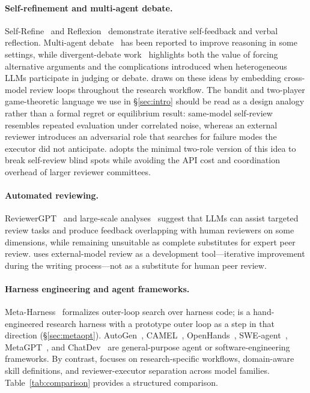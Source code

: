 \paragraph{Self-refinement and multi-agent debate.}
Self-Refine~\citep{madaan2023selfrefine} and Reflexion~\citep{shinn2023reflexion} demonstrate iterative self-feedback and verbal reflection. 
Multi-agent debate~\citep{du2024multiagentdebate} has been reported to improve reasoning in some settings, while divergent-debate work~\citep{liang2024divergent} highlights both the value of forcing alternative arguments and the complications introduced when heterogeneous LLMs participate in judging or debate.
\aris{} draws on these ideas by embedding cross-model review loops throughout the research workflow.
The bandit and two-player game-theoretic language we use in \S\ref{sec:intro} should be read as a design analogy rather than a formal regret or equilibrium result: same-model self-review resembles repeated evaluation under correlated noise, whereas an external reviewer introduces an adversarial role that searches for failure modes the executor did not anticipate.
\aris{} adopts the minimal two-role version of this idea to break self-review blind spots while avoiding the API cost and coordination overhead of larger reviewer committees.

\paragraph{Automated reviewing.}
ReviewerGPT~\citep{liu2023reviewergpt} and large-scale analyses~\citep{liang2024llmfeedback} suggest that LLMs can assist targeted review tasks and produce feedback overlapping with human reviewers on some dimensions, while remaining unsuitable as complete substitutes for expert peer review.
\aris{} uses external-model review as a development tool---iterative improvement during the writing process---not as a substitute for human peer review.

\paragraph{Harness engineering and agent frameworks.}
Meta-Harness~\citep{lee2026metaharness} formalizes outer-loop search over harness code; \aris{} is a hand-engineered research harness with a prototype outer loop as a step in that direction (\S\ref{sec:metaopt}).
AutoGen~\citep{wu2023autogen}, CAMEL~\citep{li2023camel}, OpenHands~\citep{wang2025openhands}, SWE-agent~\citep{yang2024sweagent}, MetaGPT~\citep{hong2024metagpt}, and ChatDev~\citep{qian2024chatdev} are general-purpose agent or software-engineering frameworks.
By contrast, \aris{} focuses on research-specific workflows, domain-aware skill definitions, and reviewer-executor separation across model families.
Table~\ref{tab:comparison} provides a structured comparison.

